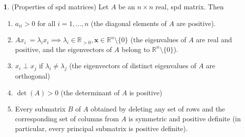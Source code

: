 \documentclass[12pt]{article}
\theoremstyle{definition}
\newcommand{\R}{\mathbb{R}}
\newcommand{\x}{\bm{x}}
\newtheorem{theorem}{\color{ForestGreen}{\textbf{Theorem}}}
\theoremstyle{definition}
\begin{document}
\begin{theorem}(Properties of spd matrices)
Let $A$ be an $n \times n$ real, spd matrix. Then
\begin{enumerate}
	\item $a_{ii} > 0$ for all $i=1, \ldots, n$ (the diagonal elements of $A$ are positive). 
	\item $A x_i \ = \lambda_i x_i \implies \lambda_i \in \R_{>0}, \x \in \R^n \setminus \{0\}$ (the eigenvalues of $A$ are real and positive, and the eigenvectors of $A$ belong to $\R^n \setminus \{0\}$).
	\item $x_i \perp x_j$ if $\lambda_i \neq \lambda_j$ (the eigenvectors of distinct eigenvalues of $A$ are orthogonal)
	\item $\det(A) > 0$ (the determinant of $A$ is positive)
	\item Every submatrix $B$ of $A$ obtained by deleting any set of rows and the corresponding set of columns from $A$ is symmetric and positive definite (in particular, every principal submatrix is positive definite). 
\end{enumerate}
\end{theorem}
\end{document}
